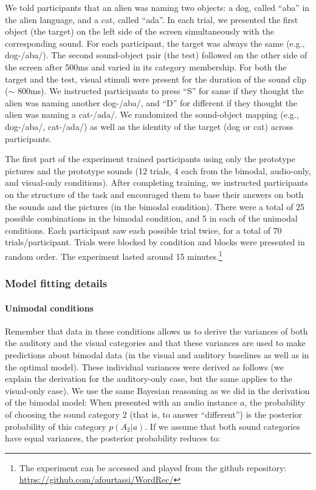 \documentclass[english,,man,floatsintext]{apa6}
\let\oldparagraph\paragraph
\renewcommand{\paragraph}[1]{\oldparagraph{#1}\mbox{}}
\let\rmarkdownfootnote\footnote%
\def\footnote{\protect\rmarkdownfootnote}
\theoremstyle{definition}
\theoremstyle{definition}
\theoremstyle{definition}
\theoremstyle{remark}
\begin{document}
We told participants that an alien was naming two objects: a dog, called
\enquote{aba} in the alien language, and a cat, called \enquote{ada}. In
each trial, we presented the first object (the target) on the left side
of the screen simultaneously with the corresponding sound. For each
participant, the target was always the same (e.g., dog-/aba/). The
second sound-object pair (the test) followed on the other side of the
screen after 500ms and varied in its category membership. For both the
target and the test, visual stimuli were present for the duration of the
sound clip (\(\sim\) 800ms). We instructed participants to press
\enquote{S} for same if they thought the alien was naming another
dog-/aba/, and \enquote{D} for different if they thought the alien was
naming a cat-/ada/. We randomized the sound-object mapping (e.g.,
dog-/aba/, cat-/ada/) as well as the identity of the target (dog or cat)
across participants.

The first part of the experiment trained participants using only the
prototype pictures and the prototype sounds (12 trials, 4 each from the
bimodal, audio-only, and visual-only conditions). After completing
training, we instructed participants on the structure of the task and
encouraged them to base their answers on both the sounds and the
pictures (in the bimodal condition). There were a total of 25 possible
combinations in the bimodal condition, and 5 in each of the unimodal
conditions. Each participant saw each possible trial twice, for a total
of 70 trials/participant. Trials were blocked by condition and blocks
were presented in random order. The experiment lasted around 15
minutes.\footnote{The experiment can be accessed and played from the
  github repository: \url{https://github.com/afourtassi/WordRec/}}

\subsubsection{Model fitting details}\label{model-fitting-details}

\paragraph{Unimodal conditions}\label{unimodal-conditions}

Remember that data in these conditions allows us to derive the variances
of both the auditory and the visual categories and that these variances
are used to make predictions about bimodal data (in the visual and
auditory baselines as well as in the optimal model). These individual
variances were derived as follows (we explain the derivation for the
auditory-only case, but the same applies to the visual-only case). We
use the same Bayesian reasoning as we did in the derivation of the
bimodal model: When presented with an audio instance \(a\), the
probability of choosing the sound category 2 (that is, to answer
\enquote{different}) is the posterior probability of this category
\(p(A_2|a)\). If we assume that both sound categories have equal
variances, the posterior probability reduces to:
\end{document}
